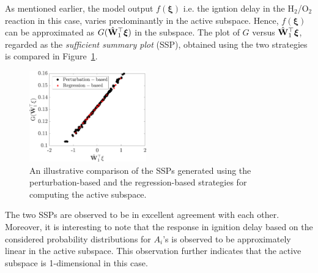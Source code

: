 As mentioned earlier, the model output $f(\bm{\xi})$ i.e. the igntion delay in the
H$_2$/O$_2$ reaction in this case, varies
 predominantly in the active subspace. Hence, 
$f(\bm{\xi})$ can be approximated as $G(\hat{\mathbf{{W}}}_1^\top\bm{\xi})$ in
the subspace. The plot of $G$ versus $\hat{\mathbf{{W}}}_1^\top\bm{\xi}$, 
regarded as the \textit{sufficient summary plot} (SSP), obtained using the two strategies is 
compared in Figure~\ref{fig:comp_ssp}.
%
\begin{figure}[htbp]
 \begin{center}
  \includegraphics[width=0.45\textwidth]{./Figures/comp_ssp}
\caption{An illustrative comparison of the SSPs generated using the 
perturbation-based and the regression-based strategies for computing the active subspace.}
\label{fig:comp_ssp}
\end{center}
\end{figure}
%
The two SSPs are observed to be in excellent agreement with each other. Moreover, it is interesting to note
that the response in ignition
delay based on the considered probability distributions for $A_i$'s is observed to be approximately linear in the
active subspace. This observation further indicates that the active subspace is 1-dimensional in this case.

